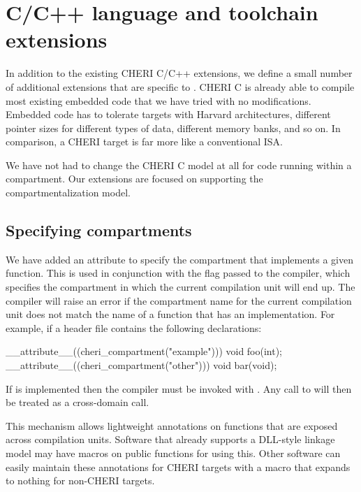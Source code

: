 \chapter{C/C++ language and toolchain extensions}
\label{chap:language}

In addition to the existing CHERI C/C++ extensions, we define a small number of additional extensions that are specific to \cherimcu{}.
CHERI C is already able to compile most existing embedded code that we have tried with no modifications.
Embedded code has to tolerate targets with Harvard architectures, different pointer sizes for different types of data, different memory banks, and so on.
In comparison, a CHERI target is far more like a conventional ISA.

We have not had to change the CHERI C model at all for code running within a compartment.
Our extensions are focused on supporting the compartmentalization model.

\section{Specifying compartments}

We have added an attribute to specify the compartment that implements a given function.
This is used in conjunction with the  flag passed to the compiler, which specifies the compartment in which the current compilation unit will end up.
The compiler will raise an error if the compartment name for the current compilation unit does not match the name of a function that has an implementation.
For example, if a header file contains the following declarations:

\begin{ccodelisting}
__attribute__((cheri_compartment("example"))) void foo(int);
__attribute__((cheri_compartment("other"))) void bar(void);
\end{ccodelisting}

If  is implemented then the compiler must be invoked with .
Any call to  will then be treated as a cross-domain call.

This mechanism allows lightweight annotations on functions that are exposed across compilation units.
Software that already supports a DLL-style linkage model may have macros on public functions for using this.
Other software can easily maintain these annotations for CHERI targets with a macro that expands to nothing for non-CHERI targets.

